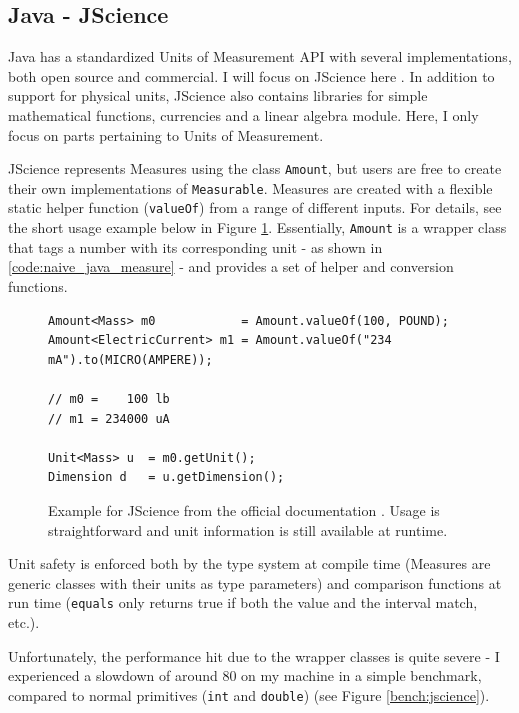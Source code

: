 \documentclass[12pt,oneside,a4paper]{scrbook}
\theoremstyle{definition}
\begin{document}
\subsection{Java - JScience}

Java has a standardized Units of Measurement API \citep{Units13} with several implementations, both open source and commercial. I will focus on JScience here \citep{Dautelle11}. In addition to support for physical units, JScience also contains libraries for simple mathematical functions, currencies and a linear algebra module. Here, I only focus on parts pertaining to Units of Measurement.

JScience represents Measures using the class \verb/Amount/, but users are free to create their own implementations of \verb/Measurable/. Measures are created with a flexible static helper function (\verb/valueOf/) from a range of different inputs. For details, see the short usage example below in Figure \ref{code:jscience_example}. Essentially, \verb/Amount/ is a wrapper class that tags a number with its corresponding unit - as shown in \ref{code:naive_java_measure} - and provides a set of helper and conversion functions.

\begin{figure}
\begin{verbatim}
Amount<Mass> m0            = Amount.valueOf(100, POUND);
Amount<ElectricCurrent> m1 = Amount.valueOf("234 mA").to(MICRO(AMPERE));

// m0 =    100 lb
// m1 = 234000 uA

Unit<Mass> u  = m0.getUnit();
Dimension d   = u.getDimension();

\end{verbatim}
\caption{Example for JScience from the official documentation \citep{Dautelle11}. Usage is straightforward and unit information is still available at runtime.}
\label{code:jscience_example}
\end{figure}

Unit safety is enforced both by the type system at compile time (Measures are generic classes with their units as type parameters) and comparison functions at run time (\verb/equals/ only returns true if both the value and the interval match, etc.).

Unfortunately, the performance hit due to the wrapper classes is quite severe - I experienced a slowdown of around 80 on my machine in a simple benchmark, compared to normal primitives (\verb/int/ and \verb/double/) (see Figure \ref{bench:jscience}).
\end{document}
